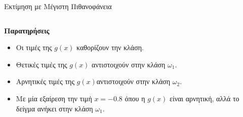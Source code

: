 \documentclass{beamer}
\begin{document}
\begin{frame}{Εκτίμηση με Μέγιστη Πιθανοφάνεια}
    \begin{columns} %
        \begin{column}{0.48\textwidth}
            \textbf{Παρατηρήσεις}
            \begin{itemize}
                \item Οι τιμές της \( g(x) \) καθορίζουν την κλάση.
                \item Θετικές τιμές της \( g(x) \) αντιστοιχούν στην κλάση \( \omega_1 \).
                \item Αρνητικές τιμές της \( g(x) \)αντιστοιχούν στην κλάση \( \omega_2 \).
                \item Με μία εξαίρεση την τιμή $x=-0.8$ όπου η $g(x)$ είναι αρνητική, αλλά το 
                δείγμα ανήκει στην κλάση \( \omega_1 \).
            \end{itemize}
        \end{column}

        \begin{column}{0.48\textwidth}
            \centering
        \end{column}
    \end{columns}
\end{frame}
\end{document}

